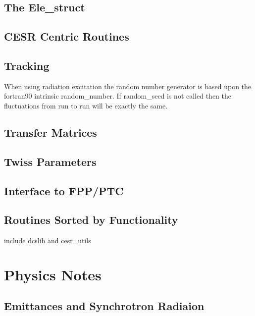 \documentclass{book}
\begin{document}
\chapter{The Ele\_struct}

\chapter{CESR Centric Routines}

\chapter{Tracking}

When using radiation excitation the random number generator is based
upon the fortran90 intrinsic random_number. If random_seed is not called
then the fluctuations from run to run will be exactly the same.

\chapter{Transfer Matrices}

\chapter{Twiss Parameters}

\chapter{Interface to FPP/PTC}

\chapter{Routines Sorted by Functionality}

include dcslib and cesr_utils

\part{Physics Notes}

\chapter{Emittances and Synchrotron Radiaion}



\begin{theindex}


\end{theindex}
\end{document}
